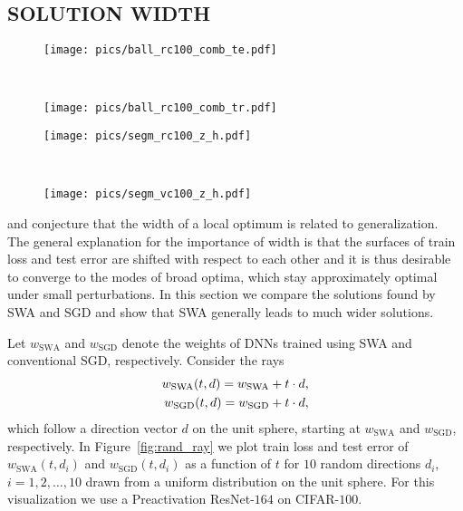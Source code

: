 \documentclass[letterpaper]{article}
\begin{document}
\subsection{SOLUTION WIDTH}
\begin{figure*}[!h]
	\centering
	\begin{subfigure}{0.42\textwidth}
		\texttt{[image: pics/ball\_rc100\_comb\_te.pdf]}
	\end{subfigure}
	~~~~
	\begin{subfigure}{0.42\textwidth}
		\texttt{[image: pics/ball\_rc100\_comb\_tr.pdf]}
	\end{subfigure}
	\caption{
      (\textbf{Left}) Test error and (\textbf{Right}) $L_2$-regularized 
      cross-entropy train loss as a function of 
      a point on a random ray starting at SWA (blue) and SGD (green) solutions
      for Preactivation ResNet-$164$ on CIFAR-$100$.
      Each line corresponds to a different random ray.
  }
	\label{fig:rand_ray}
\end{figure*}
\label{sec:optima_width}
\begin{figure*}[!h]
	\centering
	\centering
	\begin{subfigure}{0.42\textwidth}
	  \texttt{[image: pics/segm\_rc100\_z\_h.pdf]}
	\end{subfigure}
	~~~~
	\begin{subfigure}{0.42\textwidth}
	  \texttt{[image: pics/segm\_vc100\_z\_h.pdf]}
	\end{subfigure}
	\caption{
      $L_2$-regularized cross-entropy train loss and test error as a function of
      a point on the line connecting SWA and SGD solutions on CIFAR-$100$.
      \textbf{Left}: Preactivation ResNet-$164$. \textbf{Right}: VGG-$16$.
      }
	\label{fig:optima_seg}
\end{figure*}

\citet{keskar2017large} and \citet{chaudhari2016} conjecture that the width of a local
optimum is related to generalization.
The general explanation for the importance of width is that the surfaces of train
loss and test error are shifted with respect to each other and it is thus desirable
to converge to the modes of broad optima, which stay approximately optimal under small 
perturbations. In this section we compare the solutions found by SWA and SGD
and show that SWA generally leads to much wider solutions.

Let $w_{\text{SWA}}$ and $w_{\text{SGD}}$ denote the weights of DNNs trained 
using SWA and conventional SGD, respectively. 
Consider the rays 
\begin{align}
  \notag
  w_{\text{SWA}}(t, d) = w_{\text{SWA}} + t \cdot d,\\
  \notag
  w_{\text{SGD}}(t, d) = w_{\text{SGD}} + t \cdot d,
\end{align}
which follow a direction vector $d$ on the unit sphere,
starting at $w_{\text{SWA}}$ and $w_{\text{SGD}}$, respectively. In Figure~\ref{fig:rand_ray} 
we plot train loss and test error of $w_{\text{SWA}}(t, d_i)$ and
$w_{\text{SGD}}(t, d_i)$ as a function of $t$ for $10$ random directions $d_i$,
$i = 1, 2, \ldots, 10$ drawn from a uniform distribution on the unit sphere. 
For this visualization we use a Preactivation ResNet-$164$ on CIFAR-$100$.
\end{document}
